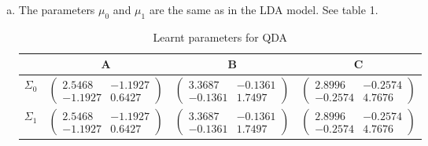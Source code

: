 \documentclass[a4paper,10pt]{article}
\newcommand{\matrice}[3]{ \begin{pmatrix}  #1 &  #3 \\ #3  & #2 \end{pmatrix}   }
\theoremstyle{exostyle}
\begin{document}
\begin{enumerate}[(a)]
\item The parameters $\mu_0$ and $\mu_1$ are the same as in the LDA model. See table 1. 
\begin{table}[!h]
\centering
\caption{Learnt parameters for QDA}

\begin{tabular}{l | c|c|c}
      & A & B & C \\ \hline \hline
$\Sigma_0  $ & $  \matrice{2.5468}{0.6427}{-1.1927}  $ & $  \matrice{3.3687}{1.7497}{-0.1361}  $  & $  \matrice{2.8996}{4.7676}{-0.2574}  $\\ \hline
\hline
$\Sigma_1 $ & $  \matrice{2.5468}{0.6427}{-1.1927}  $ & $  \matrice{3.3687}{1.7497}{-0.1361}  $  & $  \matrice{2.8996}{4.7676}{-0.2574}  $ 
\end{tabular}
\end{table}


\end{enumerate}
\end{document}
